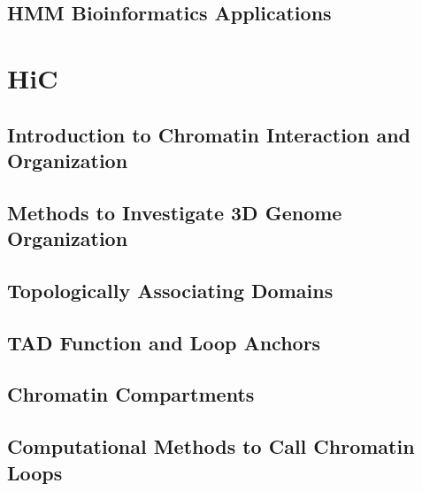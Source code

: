 \documentclass[
]{book}
\begin{document}
\hypertarget{hmm-bioinformatics-applications}{%
\section{HMM Bioinformatics Applications}\label{hmm-bioinformatics-applications}}

\hypertarget{hic}{%
\chapter{HiC}\label{hic}}

\hypertarget{introduction-to-chromatin-interaction-and-organization}{%
\section{Introduction to Chromatin Interaction and Organization}\label{introduction-to-chromatin-interaction-and-organization}}

\hypertarget{methods-to-investigate-3d-genome-organization}{%
\section{Methods to Investigate 3D Genome Organization}\label{methods-to-investigate-3d-genome-organization}}

\hypertarget{topologically-associating-domains}{%
\section{Topologically Associating Domains}\label{topologically-associating-domains}}

\hypertarget{tad-function-and-loop-anchors}{%
\section{TAD Function and Loop Anchors}\label{tad-function-and-loop-anchors}}

\hypertarget{chromatin-compartments}{%
\section{Chromatin Compartments}\label{chromatin-compartments}}

\hypertarget{computational-methods-to-call-chromatin-loops}{%
\section{Computational Methods to Call Chromatin Loops}\label{computational-methods-to-call-chromatin-loops}}
\end{document}
